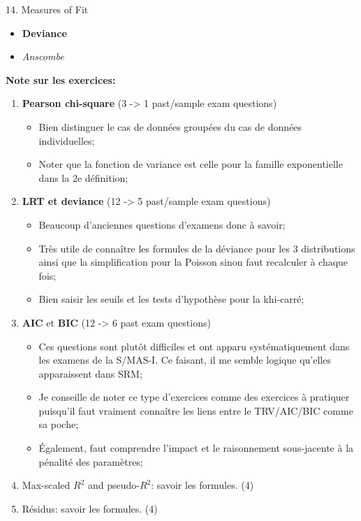 \documentclass[12pt, titlepage, french]{report}
\begin{document}
\begin{CHPT_SUMM}{14. Measures of Fit}
\begin{enumerate}
\begin{itemize}
		\item	\textbf{Deviance} 
		\item	\textit{Anscombe} 
	\end{itemize}
\end{enumerate}
\textbf{Note sur les exercices:} 
\begin{enumerate}
	\item	\textbf{Pearson chi-square} (3 -> 1 past/sample exam questions)
	\begin{itemize}
		\item	Bien distinguer le cas de données groupées du cas de données individuelles;
		\item	Noter que la fonction de variance est celle pour la famille exponentielle dans la 2e définition;
	\end{itemize}
	\item	\textbf{LRT et deviance} (12 -> 5 past/sample exam questions)
	\begin{itemize}
		\item	Beaucoup d'anciennes questions d'examens donc à savoir;
		\item	Très utile de connaître les formules de la déviance pour les 3 distributions ainsi que la simplification pour la Poisson sinon faut recalculer à chaque fois;
		\item	Bien saisir les seuils et les tests d'hypothèse pour la khi-carré;
	\end{itemize}
	\item	\textbf{AIC} et \textbf{BIC} (12 -> 6 past exam questions)
	\begin{itemize}
		\item	Ces questions sont plutôt difficiles et ont apparu systématiquement dans les examens de la S/MAS-I. Ce faisant, il me semble logique qu'elles apparaissent dans SRM;
		\item	Je conseille de noter ce type d'exercices comme des exercices à pratiquer puisqu'il faut vraiment connaître les liens entre le TRV/AIC/BIC comme sa poche;
		\item	Également, faut comprendre l'impact et le raisonnement sous-jacente à la pénalité des paramètres;
	\end{itemize}
	\item	Max-scaled $R^{2}$ and pseudo-$R^{2}$: savoir les formules. (4)
	\item	Résidus: savoir les formules. (4)
\end{enumerate}
\end{CHPT_SUMM}
\end{document}
